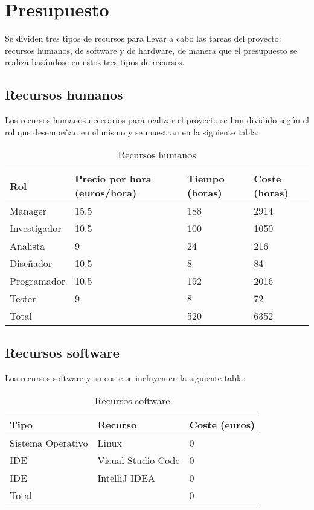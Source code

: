 \section{Presupuesto}\label{sec:presupuesto}
Se dividen tres tipos de recursos para llevar a cabo las tareas del proyecto: recursos humanos, de software y de
hardware, de manera que el presupuesto se realiza basándose en estos tres tipos de recursos.

\subsection{Recursos humanos}\label{subsec:recursos-humanos}
Los recursos humanos necesarios para realizar el proyecto se han dividido según el rol que desempeñan en el mismo
y se muestran en la siguiente tabla:

\begin{table}[H]
    \centering
    \begin{tabular}{|l|l|l|l|}
        \hline
        \textbf{Rol} & \textbf{Precio por hora (euros/hora)} & \textbf{Tiempo (horas)} & \textbf{Coste (horas)} \\
        \hline
        Manager & 15.5 & 188 & 2914 \\
        \hline
        Investigador & 10.5 & 100 & 1050 \\
        \hline
        Analista & 9 & 24 & 216 \\
        \hline
        Diseñador & 10.5 & 8 & 84 \\
        \hline
        Programador & 10.5 & 192 & 2016 \\
        \hline
        Tester & 9 & 8 & 72 \\
        \hline
        \hline
        Total & & 520 & 6352 \\
        \hline
    \end{tabular}
    \caption{Recursos humanos}
    \label{tab:tabla_recursos_humanos}
\end{table}

\subsection{Recursos software}\label{subsec:recursos-software}
Los recursos software y su coste se incluyen en la siguiente tabla:

\begin{table}[H]
    \centering
    \begin{tabular}{|l|l|l|}
        \hline
        \textbf{Tipo} & \textbf{Recurso} & \textbf{Coste (euros)} \\
        \hline
        Sistema Operativo & Linux & 0 \\
        \hline
        IDE & Visual Studio Code & 0 \\
        \hline
        IDE & IntelliJ IDEA & 0 \\
        \hline
        \hline
        Total &  & 0 \\
        \hline
    \end{tabular}
    \caption{Recursos software}
    \label{tab:tabla_recursos_software}
\end{table}

